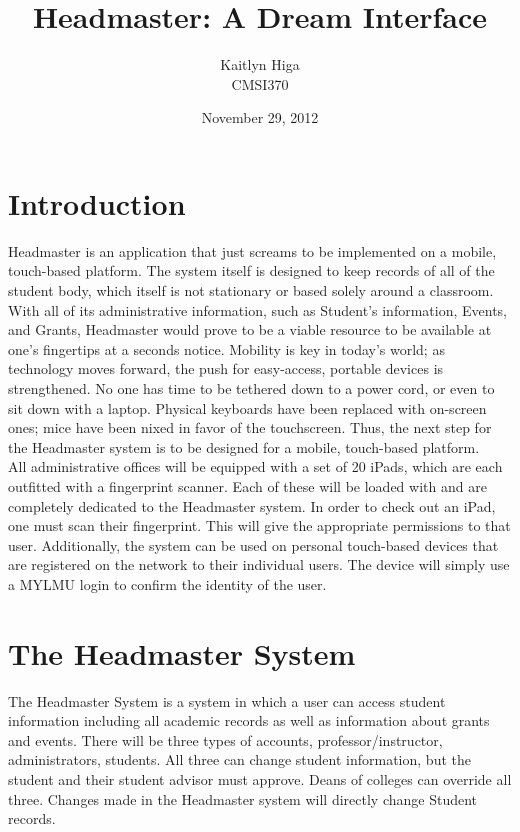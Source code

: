 \documentclass[12pt onesided letterpaper]{article}
\title{Headmaster: A Dream Interface}
\author{Kaitlyn Higa\\
        CMSI370}
\date{November 29, 2012}
\begin{document}
\maketitle
\section*{Introduction}
Headmaster is an application that just screams to be implemented on a mobile, touch-based platform.  The system itself is designed to keep records of all of the student body, which itself is not stationary or based solely around a classroom.  With all of its administrative information, such as Student's information, Events, and Grants, Headmaster would prove to be a viable resource to be available at one's fingertips at a seconds notice. Mobility is key in today's world; as technology moves forward, the push for easy-access, portable devices is strengthened.  No one has time to be tethered down to a power cord, or even to sit down with a laptop.  Physical keyboards have been replaced with on-screen ones; mice have been nixed in favor of the touchscreen. Thus, the next step for the Headmaster system is to be designed for a mobile, touch-based platform.   
\\
All administrative offices will be equipped with a set of 20 iPads, which are each outfitted with a fingerprint scanner.  Each of these will be loaded with and are completely dedicated to the Headmaster system.  In order to check out an iPad, one must scan their fingerprint.  This will give the appropriate permissions to that user.  Additionally, the system can be used on personal touch-based devices that are registered on the network to their individual users. The device will simply use a MYLMU login to confirm the identity of the user.

\section*{The Headmaster System}
The Headmaster System is a system in which a user can access student information including all academic records as well as information about grants and events.  There will be three types of accounts, professor/instructor, administrators, students.  All three can change student information, but the student and their student advisor must approve.  Deans of colleges can override all three.  Changes made in the Headmaster system will directly change Student records.
\end{document}
